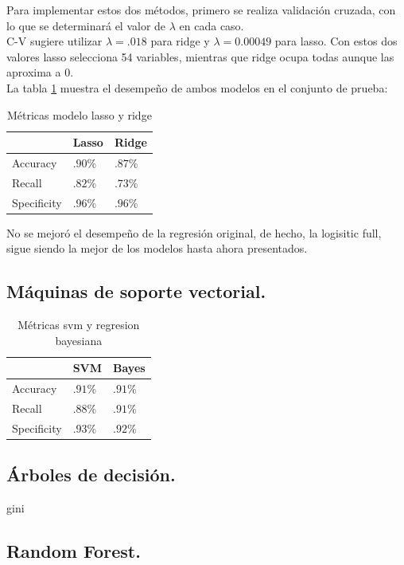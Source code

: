 \documentclass[12pt, letterpaper]{article}
\begin{document}
Para implementar estos dos métodos, primero se realiza validación cruzada, con lo que se determinará el valor de $\lambda$ en cada caso. \\

C-V sugiere utilizar $\lambda=.018$ para ridge y $\lambda=0.00049$ para lasso. Con estos dos valores lasso selecciona 54 variables, mientras que ridge ocupa todas aunque las aproxima a 0.\\

La tabla \ref{lasso} muestra el desempeño de ambos modelos en el conjunto de prueba:

\begin{table}[ht]
\centering
\begin{tabular}{|l|l|l|}
\hline
&Lasso&Ridge\\
\hline\hline
Accuracy& $.90\%$ & $.87 \%$ \\ \hline
Recall & $.82\%$ & $.73 \%$ \\ \hline
Specificity & $.96\%$ & $.96 \%$ \\ \hline
\end{tabular}
\caption{Métricas modelo lasso y ridge}
\label{lasso}
\end{table}

No se mejoró el desempeño de la regresión original, de hecho, la logisitic full, sigue siendo la mejor de los modelos hasta ahora presentados.
\subsection{Máquinas de soporte vectorial.}

\begin{table}[ht]
\centering
\begin{tabular}{|l|l|l|}
\hline
&SVM&Bayes\\
\hline\hline
Accuracy& $.91\%$ & $.91 \%$ \\ \hline
Recall & $.88\%$ & $.91 \%$ \\ \hline
Specificity & $.93\%$ & $.92 \%$ \\ \hline
\end{tabular}
\caption{Métricas svm y regresion bayesiana}
\label{svm}
\end{table}



\subsection{Árboles de decisión.}
gini

\subsection{Random Forest.}
\end{document}
